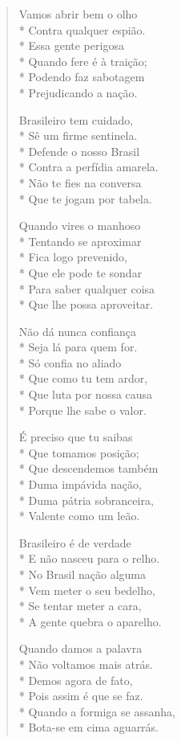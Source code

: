 \begin{verse}
Vamos abrir bem o olho\\*
Contra qualquer espião.\\*
Essa gente perigosa\\*
Quando fere é à traição;\\*
Podendo faz sabotagem\\*
Prejudicando a nação.

Brasileiro tem cuidado,\\*
Sê um firme sentinela.\\*
Defende o nosso Brasil\\*
Contra a perfídia amarela.\\*
Não te fies na conversa\\*
Que te jogam por tabela.

Quando vires o manhoso\\*
Tentando se aproximar\\*
Fica logo prevenido,\\*
Que ele pode te sondar\\*
Para saber qualquer coisa\\*
Que lhe possa aproveitar.

Não dá nunca confiança\\*
Seja lá para quem for.\\*
Só confia no aliado\\*
Que como tu tem ardor,\\*
Que luta por nossa causa\\*
Porque lhe sabe o valor.

É preciso que tu saibas\\*
Que tomamos posição;\\*
Que descendemos também\\*
Duma impávida nação,\\*
Duma pátria sobranceira,\\*
Valente como um leão.

Brasileiro é de verdade\\*
E não nasceu para o relho.\\*
No Brasil nação alguma\\*
Vem meter o seu bedelho,\\*
Se tentar meter a cara,\\*
A gente quebra o aparelho.

Quando damos a palavra\\*
Não voltamos mais atrás.\\*
Demos agora de fato,\\*
Pois assim é que se faz.\\*
Quando a formiga se assanha,\\*
Bota-se em cima aguarrás.


\end{verse}
